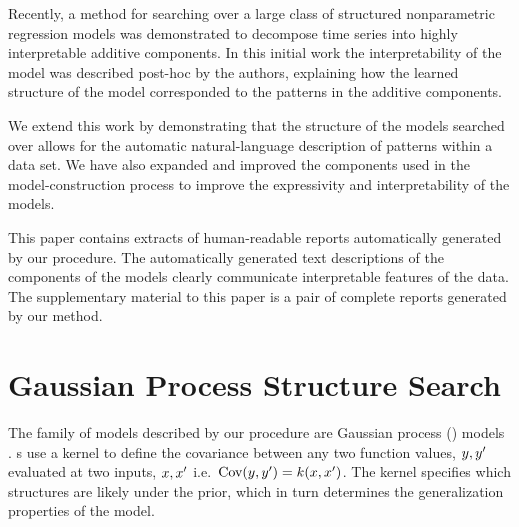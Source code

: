 \documentclass{article} %
\def\ie{i.e.\ }
\begin{document}
Recently, a method for searching over a large class of structured nonparametric regression models \citep{DuvLloGroetal13} was demonstrated to decompose time series into highly interpretable additive components.
In this initial work the interpretability of the model was described post-hoc by the authors, explaining how the learned structure of the model corresponded to the patterns in the additive components.

We extend this work by demonstrating that the structure of the models searched over allows for the automatic natural-language description of patterns within a data set.
We have also expanded and improved the components used in the model-construction process to improve the expressivity and interpretability of the models.

This paper contains extracts of human-readable reports automatically generated by our procedure.
The automatically generated text descriptions of the components of the models clearly communicate interpretable features of the data.
The supplementary material to this paper is a pair of complete reports generated by our method.



\section{Gaussian Process Structure Search}
\label{sec:gpss}
\vspace{-0.08in}

The family of models described by our procedure are Gaussian process (\gp{}) models \cite{rasmussen38gaussian}.
%
\gp{}s use a kernel to define the covariance between any two function values, $y, y'$ evaluated at two inputs, $x,x'$ \ie ${\textrm{Cov}(y, y') = k(x,x')}$.
The kernel specifies which structures are likely under the \gp{} prior, which in turn determines the generalization properties of the model.
\end{document}
